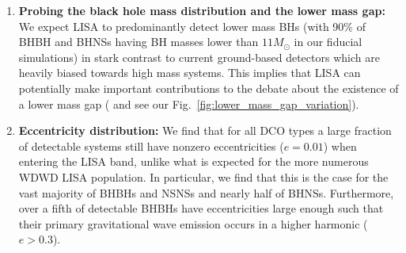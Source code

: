 \begin{enumerate}
    \item \textbf{Probing the black hole mass distribution and the lower mass gap:} We expect LISA to predominantly detect lower mass BHs (with 90\% of BHBH and BHNSs having BH masses lower than $11 \unit{M_\odot}$ in our fiducial simulations) in stark contrast to current ground-based detectors which are heavily biased towards high mass systems. This implies that LISA can potentially make important contributions to the debate about the existence of a lower mass gap (\citealt{Shao+2021} and see our Fig.~\ref{fig:lower_mass_gap_variation}).
    
    \item \textbf{Eccentricity distribution:} We find that for all DCO types a large fraction of detectable systems still have nonzero eccentricities ($e = 0.01$) when entering the LISA band, unlike what is expected for the more numerous WDWD LISA population. In particular, we find that this is the case for the vast majority of BHBHs and NSNSs and nearly half of BHNSs. Furthermore, over a fifth of detectable BHBHs have eccentricities large enough such that their primary gravitational wave emission occurs in a higher harmonic ($e > 0.3$).
    

\end{enumerate}
